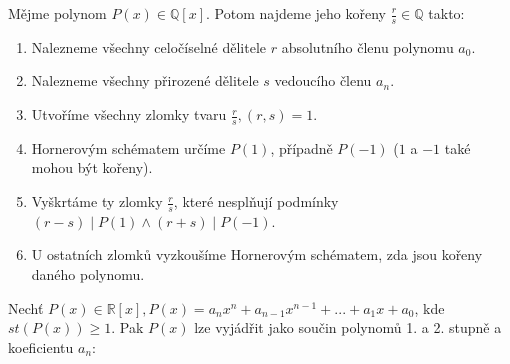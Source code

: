 \begin{veta}
  Mějme polynom $P(x) \in \mathbb Q [x]$. Potom najdeme jeho kořeny $\frac{r}{s} \in \mathbb Q$ takto:
  \begin{enumerate}[1.]
    \item Nalezneme všechny celočíselné dělitele $r$ absolutního členu polynomu $a_0$.
    \item Nalezneme všechny přirozené dělitele $s$ vedoucího členu $a_n$.
    \item Utvoříme všechny zlomky tvaru $\frac{r}{s}, (r,s) = 1$.
    \item Hornerovým schématem určíme $P(1)$, případně $P(-1)$ ($1$ a $-1$ také mohou být kořeny).
    \item Vyškrtáme ty zlomky $\frac{r}{s}$, které nesplňují podmínky $(r-s) \mid P(1) \land (r+s) \mid P(-1)$.
    \item U ostatních zlomků vyzkoušíme Hornerovým schématem, zda jsou kořeny daného polynomu.
  \end{enumerate}
\end{veta}

\begin{veta}
  Nechť $P(x) \in \mathbb R [x], P(x) = a_n x^n + a_{n-1} x^{n-1} + ... + a_1 x + a_0$, kde $st(P(x)) \geq 1$. Pak $P(x)$ lze vyjádřit jako součin polynomů 1. a 2. stupně a koeficientu $a_n$:
\end{veta}



